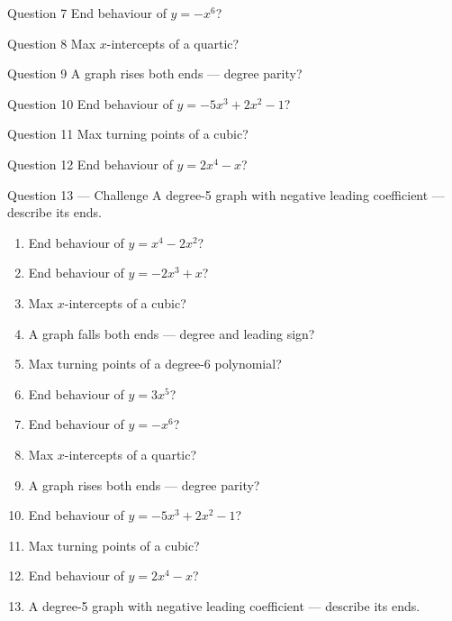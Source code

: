 \documentclass[11pt]{article}
\begin{document}
\begin{qbox}{Question 7}
End behaviour of $y=-x^6$?\workspace{2.4cm}
\end{qbox}

\begin{qbox}{Question 8}
Max $x$-intercepts of a quartic?\workspace{2.4cm}
\end{qbox}

\begin{qbox}{Question 9}
A graph rises both ends — degree parity?\workspace{2.4cm}
\end{qbox}

\begin{qbox}{Question 10}
End behaviour of $y=-5x^3+2x^2-1$?\workspace{2.4cm}
\end{qbox}

\begin{qbox}{Question 11}
Max turning points of a cubic?\workspace{2.4cm}
\end{qbox}

\begin{qbox}{Question 12}
End behaviour of $y=2x^4-x$?\workspace{2.4cm}
\end{qbox}

\begin{qbox}{Question 13 --- Challenge}
A degree-5 graph with negative leading coefficient — describe its ends.\workspace{2.6cm}
\end{qbox}

\clearpage
{}

\begin{recapbox}
\begin{multicols}{2}
\small
\begin{enumerate}[leftmargin=*,itemsep=3pt]
  \item End behaviour of $y=x^4-2x^2$?
  \item End behaviour of $y=-2x^3+x$?
  \item Max $x$-intercepts of a cubic?
  \item A graph falls both ends — degree and leading sign?
  \item Max turning points of a degree-6 polynomial?
  \item End behaviour of $y=3x^5$?
  \item End behaviour of $y=-x^6$?
  \item Max $x$-intercepts of a quartic?
  \item A graph rises both ends — degree parity?
  \item End behaviour of $y=-5x^3+2x^2-1$?
  \item Max turning points of a cubic?
  \item End behaviour of $y=2x^4-x$?
  \item A degree-5 graph with negative leading coefficient — describe its ends.
\end{enumerate}
\end{multicols}
\end{recapbox}
\end{document}
